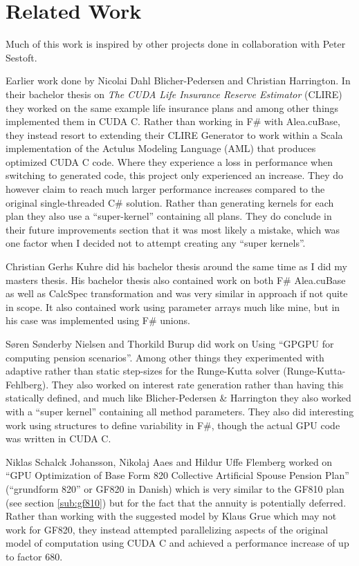 \section{Related Work}\label{sec:relatedwork}
Much of this work is inspired by other projects done in collaboration with Peter Sestoft.

Earlier work done by Nicolai Dahl Blicher-Pedersen and Christian Harrington.
In their bachelor thesis on \emph{The CUDA Life Insurance Reserve Estimator} (CLIRE)\cite{dahlharrington} they worked on the same example life insurance plans and among other things implemented them in CUDA C.
Rather than working in F\# with Alea.cuBase, they instead resort to extending their CLIRE Generator to work within a Scala implementation of the Actulus Modeling Language (AML) that produces optimized CUDA C code.
Where they experience a loss in performance when switching to generated code, this project only experienced an increase.
They do however claim to reach much larger performance increases compared to the original single-threaded C\# solution.
Rather than generating kernels for each plan they also use a ``super-kernel'' containing all plans. 
They do conclude in their future improvements section that it was most likely a mistake, which was one factor when I decided not to attempt creating any ``super kernels''.

Christian Gerhs Kuhre\cite{christiangk} did his bachelor thesis around the same time as I did my masters thesis.
His bachelor thesis also contained work on both F\# Alea.cuBase as well as CalcSpec transformation and was very similar in approach if not quite in scope.
It also contained work using parameter arrays much like mine, but in his case was implemented using F\# unions.

S\o{}ren S\o{}nderby Nielsen and Thorkild Burup did work on Using ``GPGPU for computing pension scenarios''\cite{nielsenburup}. 
Among other things they experimented with adaptive rather than static step-sizes for the Runge-Kutta solver (Runge-Kutta-Fehlberg).
They also worked on interest rate generation rather than having this statically defined, and much like Blicher-Pedersen \& Harrington they also worked with a ``super kernel'' containing all method parameters.
They also did interesting work using structures to define variability in F\#, though the actual GPU code was written in CUDA C.

Niklas Schalck Johansson, Nikolaj Aaes and Hildur Uffe Flemberg worked on ``GPU Optimization of Base Form 820 Collective Artificial Spouse Pension Plan''\cite{aaesjohanssonflemberg} (``grundform 820'' or GF820 in Danish) which is very similar to the GF810 plan (see section \ref{sub:gf810}) but for the fact that the annuity is potentially deferred. 
Rather than working with the suggested model by Klaus Grue which may not work for GF820, they instead attempted parallelizing aspects of the original model of computation using CUDA C and achieved a performance increase of up to factor 680.
